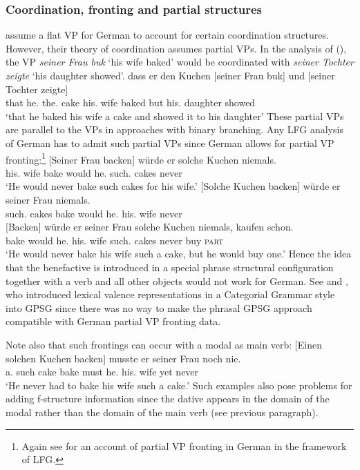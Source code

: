 \subsubsection{Coordination, fronting and partial structures}

\citet{FR2009a-u} assume a flat VP for German to account for certain coordination
structures. However, their theory of coordination assumes partial VPs. In the analysis of (), the VP \emph{seiner Frau buk} `his wife baked' would
be coordinated with \emph{seiner Tochter zeigte} `his daughter showed'.
\ea
\gll dass er den Kuchen [seiner Frau buk] und [seiner Tochter zeigte]\\
     that he.\nom{} the.\acc{} cake \spacebr{}his.\dat{} wife baked but \spacebr{}his.\dat{} daughter showed\\
\glt `that he baked his wife a cake and showed it to his daughter'
\z
These partial VPs are parallel to the VPs in approaches with binary
branching. Any LFG analysis of German has to admit such partial VPs since German allows for partial VP fronting:\footnote{%
  Again see  for an account of partial VP fronting in German in the framework of LFG.
}
\eal
\ex
\gll {}[Seiner Frau backen] würde er solche Kuchen niemals.\\
     \spacebr{}his.\dat{} wife bake would he.\nom{} such.\acc{} cakes never\\
\glt `He would never bake such cakes for his wife.'
\ex
\gll {}[Solche Kuchen backen] würde er seiner Frau niemals.\\
     \spacebr{}such.\acc{} cakes bake would he.\nom{} his.\dat{} wife never\\
\ex
\gll {}[Backen] würde er seiner Frau solche Kuchen niemals, kaufen schon.\\
     \spacebr{}bake would he.\nom{} his.\dat{} wife such.\acc{} cakes never      buy    \textsc{part}\\
\glt `He would never bake his wife such a cake, but he would buy one.'
\zl
Hence the idea that the benefactive is introduced in a special phrase structural configuration
together with a verb and all other objects would
not work for German. See \citet{Nerbonne86a} and \citet{Johnson86a}, who introduced lexical valence
representations in a Categorial Grammar style into GPSG since there was no way to make the phrasal
GPSG approach compatible with German partial VP fronting data. 

Note also that such frontings can occur with a modal as main verb:
\ea
\gll {}[Einen solchen Kuchen backen] musste er seiner Frau noch nie.\\
     \spacebr{}a.\acc{} such    cake   bake   must   he.\nom{} his.\dat{}    wife yet never\\
\glt `He never had to bake his wife such a cake.'
\z
Such examples also pose problems for adding f-structure information since the dative appears in the
domain of the modal rather than the domain of the main verb (see previous paragraph).

